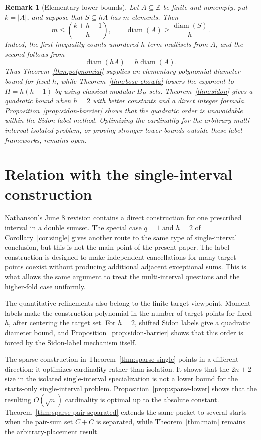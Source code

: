 \documentclass[11pt]{article}
\newtheorem{remark}{Remark}
\newcommand{\Z}{\mathbb{Z}}
\begin{document}
\begin{remark}[Elementary lower bounds]\label{rem:lower-bounds}
Let $A\subseteq\Z$ be finite and nonempty, put $k=|A|$, and suppose that
$S\subseteq hA$ has $m$ elements. Then
\[
 m\leq \binom{k+h-1}{h},
 \qquad
 \operatorname{diam}(A)\geq \frac{\operatorname{diam}(S)}{h}.
\]
Indeed, the first inequality counts unordered $h$-term multisets from $A$,
and the second follows from
\[
 \operatorname{diam}(hA)=h\operatorname{diam}(A).
\]
Thus Theorem~\ref{thm:polynomial} supplies an elementary polynomial diameter
bound for fixed $h$, while Theorem~\ref{thm:bose-chowla} lowers the exponent
to $H=h(h-1)$ by using classical modular $B_H$ sets. Theorem~\ref{thm:sidon}
gives a quadratic bound when $h=2$ with better constants and a direct
integer formula. Proposition~\ref{prop:sidon-barrier} shows that the
quadratic order is unavoidable within the Sidon-label method. Optimizing the
cardinality for the arbitrary multi-interval isolated problem, or proving
stronger lower bounds outside these label frameworks, remains open.
\end{remark}

\section{Relation with the single-interval construction}

Nathanson's June 8 revision contains a direct construction for one prescribed
interval in a double sumset. The special case $q=1$ and $h=2$ of
Corollary~\ref{cor:single} gives another route to the same type of
single-interval conclusion, but this is not the main point of the present
paper. The label construction is designed to make independent cancellations
for many target points coexist without producing additional adjacent
exceptional sums. This is what allows the same argument to treat the
multi-interval questions and the higher-fold case uniformly.

The quantitative refinements also belong to the finite-target viewpoint.
Moment labels make the construction polynomial in the number of target
points for fixed $h$, after centering the target set. For $h=2$, shifted
Sidon labels give a quadratic diameter bound, and
Proposition~\ref{prop:sidon-barrier} shows that this order is forced by the
Sidon-label mechanism itself.

The sparse construction in Theorem~\ref{thm:sparse-single} points in a
different direction: it optimizes cardinality rather than isolation. It shows
that the $2n+2$ size in the isolated single-interval specialization is not a
lower bound for the starts-only single-interval problem.
Proposition~\ref{prop:sparse-lower} shows that the resulting $O(\sqrt n)$
cardinality is optimal up to the absolute constant.
Theorem~\ref{thm:sparse-pair-separated} extends the same packet to several
starts when the pair-sum set $C+C$ is separated, while
Theorem~\ref{thm:main} remains the arbitrary-placement result.
\end{document}
